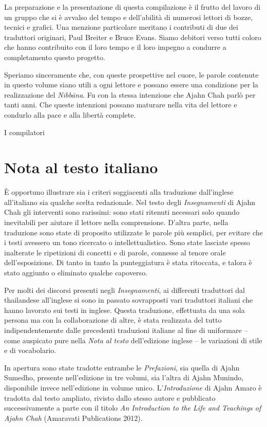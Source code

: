 La preparazione e la presentazione di questa compilazione è il frutto
del lavoro di un gruppo che si è avvalso del tempo e dell'abilità di
numerosi lettori di bozze, tecnici e grafici. Una menzione particolare
meritano i contributi di due dei traduttori originari, Paul Breiter e
Bruce Evans. Siamo debitori verso tutti coloro che hanno contribuito con
il loro tempo e il loro impegno a condurre a completamento questo
progetto.

Speriamo sinceramente che, con queste prospettive nel cuore, le parole
contenute in questo volume siano utili a ogni lettore e possano essere
una condizione per la realizzazione del \emph{Nibbāna}. Fu con la stessa
intenzione che Ajahn Chah parlò per tanti anni. Che queste intenzioni
possano maturare nella vita del lettore e condurlo alla pace e alla
libertà complete.

I compilatori

\section{Nota al testo italiano}

È opportuno illustrare sia i criteri soggiacenti alla traduzione
dall'inglese all'italiano sia qualche scelta redazionale. Nel testo
degli \emph{Insegnamenti} di Ajahn Chah gli interventi sono rarissimi:
sono stati ritenuti necessari solo quando inevitabili per aiutare il
lettore nella comprensione. D'altra parte, nella traduzione sono state
di proposito utilizzate le parole più semplici, per evitare che i testi
avessero un tono ricercato o intellettualistico. Sono state lasciate
spesso inalterate le ripetizioni di concetti e di parole, connesse al
tenore orale dell'esposizione. Di tanto in tanto la punteggiatura è
stata ritoccata, e talora è stato aggiunto o eliminato qualche
capoverso.

Per molti dei discorsi presenti negli \emph{Insegnamenti}, ai differenti
traduttori dal thailandese all'inglese si sono in passato sovrapposti
vari traduttori italiani che hanno lavorato sui testi in inglese. Questa
traduzione, effettuata da una sola persona ma con la collaborazione di
altre, è stata realizzata del tutto indipendentemente dalle precedenti
traduzioni italiane al fine di uniformare -- come auspicato pure nella
\emph{Nota al testo} dell'edizione inglese -- le variazioni di stile e
di vocabolario.

In apertura sono state tradotte entrambe le \emph{Prefazioni}, sia
quella di Ajahn Sumedho, presente nell'edizione in tre volumi, sia
l'altra di Ajahn Munindo, disponibile invece nell'edizione in volume
unico\emph{.} L'\emph{Introduzione} di Ajahn Amaro è tradotta dal testo
ampliato, rivisto dallo stesso autore e pubblicato successivamente a
parte con il titolo \emph{An Introduction to the Life and Teachings of
Ajahn Chah} (Amaravati Publications 2012).

